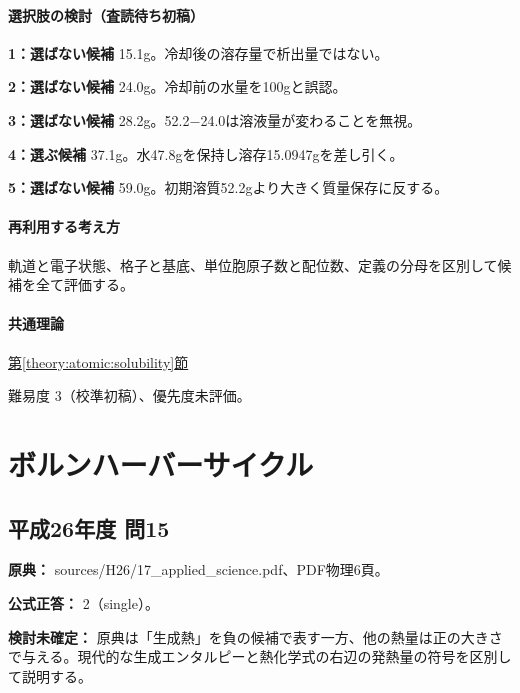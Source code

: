 \paragraph{選択肢の検討（査読待ち初稿）}\mbox{}\par

\noindent\textbf{1：選ばない候補} 15.1g。冷却後の溶存量で析出量ではない。\par

\noindent\textbf{2：選ばない候補} 24.0g。冷却前の水量を100gと誤認。\par

\noindent\textbf{3：選ばない候補} 28.2g。52.2−24.0は溶液量が変わることを無視。\par

\noindent\textbf{4：選ぶ候補} 37.1g。水47.8gを保持し溶存15.0947gを差し引く。\par

\noindent\textbf{5：選ばない候補} 59.0g。初期溶質52.2gより大きく質量保存に反する。\par

\paragraph{再利用する考え方} 軌道と電子状態、格子と基底、単位胞原子数と配位数、定義の分母を区別して候補を全て評価する。

\paragraph{共通理論} \hyperref[theory:atomic:solubility]{第\ref*{theory:atomic:solubility}節}

\par 難易度 3（校準初稿）、優先度未評価。

\section{ボルンハーバーサイクル}

\subsection{平成26年度 問15}
\label{q:h26-reg-applied-15}

\noindent\textbf{原典：} sources/H26/17\_applied\_science.pdf、PDF物理6頁。

\textbf{公式正答：} 2（single）。

\par\textbf{検討未確定：} 原典は「生成熱」を負の候補で表す一方、他の熱量は正の大きさで与える。現代的な生成エンタルピーと熱化学式の右辺の発熱量の符号を区別して説明する。

